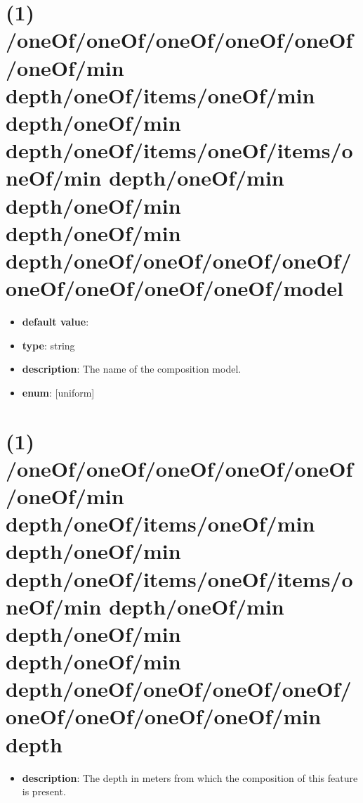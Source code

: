 \section{(1) /oneOf/oneOf/oneOf/oneOf/oneOf/oneOf/min depth/oneOf/items/oneOf/min depth/oneOf/min depth/oneOf/items/oneOf/items/oneOf/min depth/oneOf/min depth/oneOf/min depth/oneOf/min depth/oneOf/oneOf/oneOf/oneOf/oneOf/oneOf/oneOf/oneOf/model}
\begin{itemize}[leftmargin=1em]\item {\bf default value}: 
\item {\bf type}: string
\item {\bf description}: The name of the composition model.
\item {\bf enum}: [uniform]\end{itemize}\section{(1) /oneOf/oneOf/oneOf/oneOf/oneOf/oneOf/min depth/oneOf/items/oneOf/min depth/oneOf/min depth/oneOf/items/oneOf/items/oneOf/min depth/oneOf/min depth/oneOf/min depth/oneOf/min depth/oneOf/oneOf/oneOf/oneOf/oneOf/oneOf/oneOf/oneOf/min depth}
\begin{itemize}[leftmargin=1em]\item {\bf description}: The depth in meters from which the composition of this feature is present.
\end{itemize}
